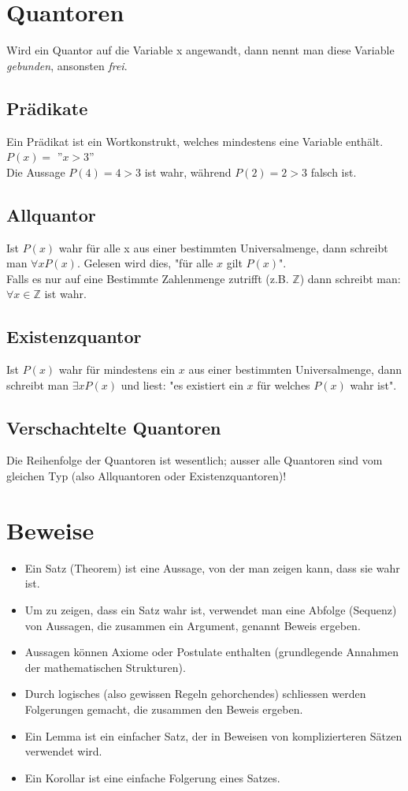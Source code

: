 \documentclass[12pt]{scrartcl}
\begin{document}
\section{Quantoren}
Wird ein Quantor auf die Variable x angewandt, dann nennt man diese Variable \textit{gebunden}, ansonsten \textit{frei}.
\subsection{Prädikate}
Ein Prädikat ist ein Wortkonstrukt, welches mindestens eine Variable enthält.\\
$P(x) =$ ''$x > 3$''\\
Die Aussage $P(4) = 4 > 3$ ist wahr, während $P(2) = 2 > 3$ falsch ist.

\subsection{Allquantor}
Ist $P(x)$ wahr für alle x aus einer bestimmten Universalmenge, dann schreibt man $\forall x P(x)$.
Gelesen wird dies, "für alle $x$ gilt $P(x)$".\\
Falls es nur auf eine Bestimmte Zahlenmenge zutrifft (z.B. $\mathbb{Z}$) dann schreibt man:\\
$\forall x \in \mathbb{Z}$ ist wahr.

\subsection{Existenzquantor}
Ist $P(x)$ wahr für mindestens ein $x$ aus einer bestimmten Universalmenge, dann schreibt man $\exists x P(x)$
und liest: "es existiert ein $x$ für welches $P(x)$ wahr ist".


\subsection{Verschachtelte Quantoren}
Die Reihenfolge der Quantoren ist wesentlich; ausser alle Quantoren sind vom gleichen Typ (also Allquantoren oder Existenzquantoren)!


\newpage
\section{Beweise}
\begin{itemize}
    \item Ein Satz (Theorem) ist eine Aussage, von der man zeigen kann, dass sie wahr ist.
    \item Um zu zeigen, dass ein Satz wahr ist, verwendet man eine Abfolge (Sequenz) von Aussagen, die zusammen ein Argument, genannt Beweis ergeben.
    \item Aussagen können Axiome oder Postulate enthalten (grundlegende Annahmen der mathematischen Strukturen).
    \item Durch logisches (also gewissen Regeln gehorchendes) schliessen werden Folgerungen gemacht, die zusammen den Beweis ergeben.
    \item Ein Lemma ist ein einfacher Satz, der in Beweisen von komplizierteren Sätzen verwendet wird.
    \item Ein Korollar ist eine einfache Folgerung eines Satzes.
\end{itemize}
\end{document}
